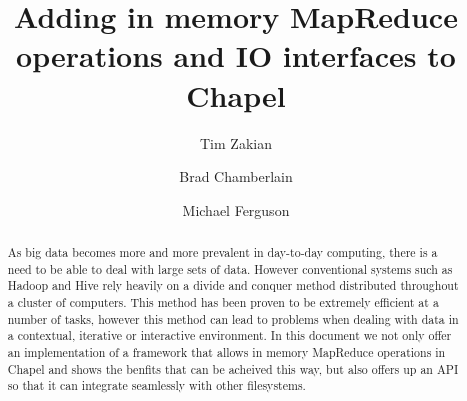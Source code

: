 \documentclass[10pt]{article}
\begin{document}


\title{Adding in memory MapReduce operations and IO interfaces to Chapel}

\author{Tim Zakian \and Brad Chamberlain \and Michael Ferguson}

\maketitle

\begin{abstract}


As big data becomes more and more prevalent in day-to-day computing,
there is a need to be able to deal with large sets of data. However
conventional systems such as Hadoop and Hive rely heavily on a divide and conquer method distributed throughout a
cluster of computers. This method has been proven to be extremely efficient
at a number of tasks, however this method can lead to problems when dealing
with data in a contextual, iterative or interactive environment. In this
document we not only offer an implementation of a framework that allows in memory MapReduce
operations in Chapel and shows the benfits that can be acheived this way,
but also offers up an API so that it can integrate seamlessly with other
filesystems. 
\end{abstract}







\end{document}
